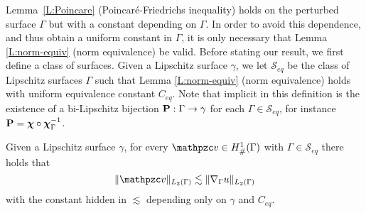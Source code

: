 Lemma~\ref{L:Poincare} (Poincar\'e-Friedrichs inequality) holds on the perturbed surface $\Gamma$ but with a constant depending on $\Gamma$.  In order to avoid this dependence, and thus obtain a uniform constant in $\Gamma$, it is only necessary that Lemma \ref{L:norm-equiv} (norm equivalence) be valid. Before stating our result, we first define a class of surfaces.  Given a Lipschitz surface $\gamma$, we let $\mathcal{S}_{eq}$ be the class of Lipschitz surfaces $\Gamma$ such that Lemma \ref{L:norm-equiv} (norm equivalence) holds with uniform equivalence constant $C_{eq}$. Note that implicit in this definition is the existence of a bi-Lipschitz bijection ${\bf P}:\Gamma \rightarrow \gamma$ for each $\Gamma \in \mathcal{S}_{eq}$,  for instance ${\bf P} = {\boldsymbol \chi}\circ{\boldsymbol \chi}_\Gamma^{-1}$.

\begin{lemma}\label{L:Poincare-unif}
Given a Lipschitz surface $\gamma$, for every $\tv \in H^1_\#(\Gamma)$ with $\Gamma \in \mathcal{S}_{eq}$ there holds that
%
\begin{equation}\label{poincare_unif}
\|\tv\|_{L_2(\Gamma)} \lesssim \|\nabla_\Gamma u\|_{L_2(\Gamma)}
\end{equation}
%
with the constant hidden in $\lesssim$ depending only on $\gamma$ and $C_{eq}$. 
\end{lemma}
%
